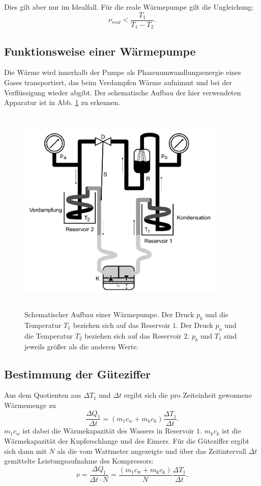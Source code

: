 \noindent Dies gilt aber nur im Idealfall. Für die reale Wärmepumpe gilt die 
Ungleichung:
\begin{equation*}
    \nu_{real} < \frac{T_1}{T_1-T_2}.
\end{equation*}

\subsection{Funktionsweise einer Wärmepumpe}
Die Wärme wird innerhalb der Pumpe als Phasenumwandlungsenergie eines Gases 
transportiert, das beim Verdampfen Wärme aufnimmt und bei der Verflüssigung wieder 
abgibt. Der schematische Aufbau der hier verwendeten Apparatur ist in Abb. \ref{fig:aufbau1} zu 
erkennen.
\begin{figure}
    \centering
    \includegraphics[width=10cm, height=10cm]{build/1.png}
    \caption{Schematischer Aufbau einer Wärmepumpe. Der Druck $p_b$ und die Temperatur
    $T_1$ beziehen sich auf das Reservoir $\num{1}$. Der Druck $p_a$ und die Temperatur
    $T_2$ beziehen sich auf das Reservoir $\num{2}$. $p_b$ und $T_1$ sind jeweils
    größer als die anderen Werte.}
    \label{fig:aufbau1}
\end{figure}

\subsection{Bestimmung der Güteziffer}
Aus dem Quotienten aus $\Delta T_1$ und $\Delta t$ ergibt sich die pro Zeiteinheit 
gewonnene Wärmemenge zu
\begin{equation*}
    \frac{\Delta Q_1}{\Delta t} = (m_1 c_w + m_k c_k)\frac{\Delta T_1}{\Delta t}.
    \label{eqn:Q1}
\end{equation*}
$m_1 c_w$ ist dabei die Wärmekapazität des Wassers in Reservoir $\num{1}$. $m_k c_k$ ist die 
Wärmekapazität der Kupferschlange und des Eimers. Für die Güteziffer ergibt sich dann 
mit $N$ als die vom Wattmeter angezeigte und über das Zeitintervall $\Delta t$ 
gemittelte Leistungsaufnahme des Kompressors:
\begin{equation}
    \nu = \frac{\Delta Q_1}{\Delta t \cdot N} = \frac{(m_1 c_\text{w} + m_\text{k} c_\text{k})}{N} \frac{\Delta T_1}{\Delta t}.
    \label{eqn:güteziffer}
\end{equation}

